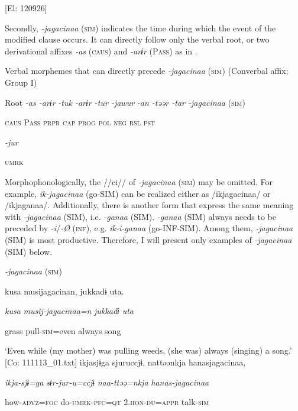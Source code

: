     [El: 120926]

  Secondly, \textit{{}-jagacinaa} (\textsc{sim}) indicates the time during which the event of the modified clause occurs. It can directly follow only the verbal root, or two derivational affixes \textit{{}-as} (\textsc{caus}) and \textit{{}-arɨr} (P\textsc{ass}) as in .

\ea\label{ex:8-97}
  Verbal morphemes that can directly precede \textit{{}-jagacinaa} (\textsc{sim}) (Converbal affix; Group I)

  Root  \textit{{}-as  {}-arɨr} %
\textit{{}-tuk  {}-arɨr  {}-tur  {}-jawur} %
\textit{{}-an  {}-təər  {}-tar  {}-jagacinaa} (\textsc{sim})

    \textsc{caus}  P\textsc{ass}  \textsc{prpr}  \textsc{cap}  \textsc{prog}  \textsc{pol}  \textsc{neg}  \textsc{rsl}  \textsc{pst}

          \textit{{}-jur} 

          \textsc{umrk}

Morphophonologically, the //ci// of \textit{{}-jagacinaa} (\textsc{sim}) may be omitted. For example, \textit{ik-jagacinaa} (go-SIM) can be realized either as /ikjagacinaa/ or /ikjaganaa/. Additionally, there is another form that express the same meaning with \textit{{}-jagacinaa} (SIM), i.e. \textit{{}-ganaa} (SIM). \textit{{}-ganaa} (SIM) always needs to be preceded by \textit{{}-i}/\textit{{}-Ø} (\textsc{inf}), e.g. \textit{ik-i-ganaa} (go-INF-SIM). Among them, \textit{{}-jagacinaa} (SIM) is most productive. Therefore, I will present only examples of \textit{{}-jagacinaa} (SIM) below.

\ea\label{ex:8-98}
  \textit{{}-jagacinaa} (\textsc{sim})

\ea {\TM}
\glll  kusa  musijagacinan,  jukkadɨ  uta.

      \textit{kusa}  \textit{musij-jagacinaa=n}  \textit{jukkadɨ}  \textit{uta}

      grass  pull-\textsc{sim}=even  always  song

\glt ‘Even while (my mother) was pulling weeds, (she was) always (singing) a song.’ [Co: 111113\_01.txt]
\ex {\TM}
\glll  ikjasjɨga  sjuruccjɨ,  nattəənkja  hanasjagacinaa,

      \textit{ikja-sjɨ=ga}  \textit{sɨr-jur-u=ccjɨ}  \textit{naa-ttəə=nkja}  \textit{hanas-jagacinaa}

      how-\textsc{advz}=\textsc{foc}  do-\textsc{umrk}-\textsc{pfc}=\textsc{qt}  2.\textsc{hon}-\textsc{du}=\textsc{appr}  talk-\textsc{sim}

